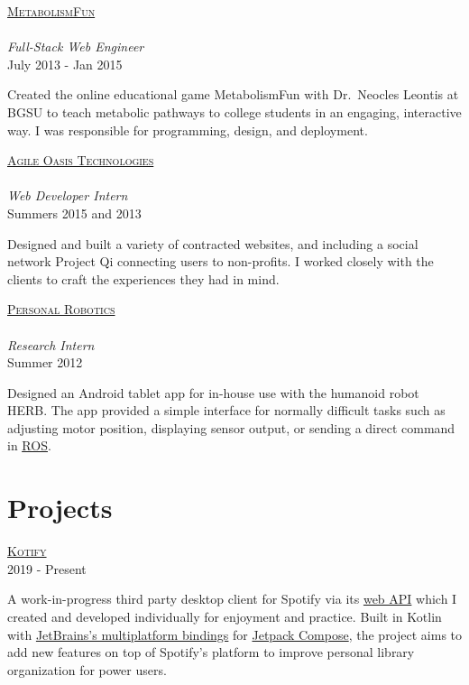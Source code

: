 \documentclass[letterpaper,10pt]{article}
\newcommand{\lb}{\vspace{4pt} \\}
\newenvironment{resumecols2}[2]
{
    \begin{minipage}[t]{.21\linewidth}
        \begin{flushright}
            \textsc{#1}
            \lb
            \small{#2}
        \end{flushright}
    \end{minipage}
    \hspace{.004\linewidth}
    \begin{minipage}[t]{.775\linewidth}
}
{
    \end{minipage}
}
\newenvironment{resumecols}[4]
{
    \begin{minipage}[t]{.21\linewidth}
        \begin{flushright}
            \href{#2}{\textsc{#1}} \\
            \lb
            \small{\textit{#3}} \\
            \small{#4}
        \end{flushright}
    \end{minipage}
    \hspace{.004\linewidth}
    \begin{minipage}[t]{.775\linewidth}
}
{
    \end{minipage}
}
\begin{document}
\vspace{6pt}

\begin{resumecols}{MetabolismFun }{https://github.com/dzirbel/metabolism-fun}{Full-Stack Web Engineer}{July 2013 - Jan 2015}
    Created the online educational game MetabolismFun with Dr.\ Neocles Leontis at BGSU to teach metabolic pathways to college students in an engaging, interactive way. I was responsible for programming, design, and deployment.
\end{resumecols}

\vspace{6pt}

\begin{resumecols}{Agile Oasis Technologies}{http://agileoasis.com}{Web Developer Intern}{Summers 2015 and 2013}
    Designed and built a variety of contracted websites, and including a social network Project Qi connecting users to non-profits. I worked closely with the clients to craft the experiences they had in mind.
\end{resumecols}

\vspace{6pt}

\begin{resumecols}{Personal Robotics}{https://personalrobotics.cs.washington.edu}{Research Intern}{Summer 2012}
    Designed an Android tablet app for in-house use with the humanoid robot HERB. The app provided a simple interface for normally difficult tasks such as adjusting motor position, displaying sensor output, or sending a direct command in \href{https://www.ros.org/}{\underline{ROS}}.
\end{resumecols}

\section{Projects}

\begin{resumecols2}{\href{https://github.com/dzirbel/kotify}{Kotify \faicon{github}}}{2019 - Present}
    A work-in-progress third party desktop client for Spotify via its \href{https://developer.spotify.com/documentation/web-api/}{web API} which I created and developed individually for enjoyment and practice. Built in Kotlin with \href{https://www.jetbrains.com/lp/compose-mpp/}{JetBrains's multiplatform bindings} for \href{https://developer.android.com/jetpack/compose}{Jetpack Compose}, the project aims to add new features on top of Spotify's platform to improve personal library organization for power users.
\end{resumecols2}
\end{document}
